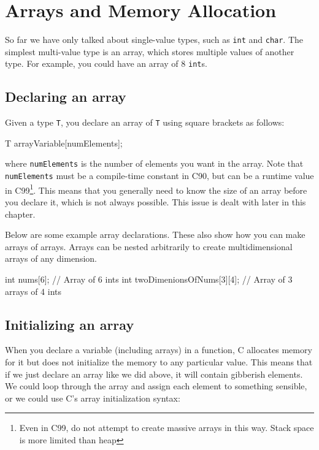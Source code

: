 
\chapter{Arrays and Memory Allocation}

So far we have only talked about single-value types, such as \texttt{int} and \texttt{char}.
The simplest multi-value type is an array, which stores multiple values of another type.
For example, you could have an array of 8 \texttt{int}s.

\section{Declaring an array}

Given a type \texttt{T}, you declare an array of \texttt{T} using square brackets as follows:
\begin{codeinline}
T arrayVariable[numElements];
\end{codeinline}
where \texttt{numElements} is the number of elements you want in the array.
Note that \texttt{numElements} must be a compile-time constant in C90, but can be a runtime value in C99\footnote{Even in C99, do not attempt to create massive arrays in this way.
Stack space is more limited than heap}.
This means that you generally need to know the size of an array before you declare it, which is not always possible.
This issue is dealt with later in this chapter.

Below are some example array declarations.
These also show how you can make arrays of arrays.
Arrays can be nested arbitrarily to create multidimensional arrays of any dimension.

\begin{codeblock}
int nums[6]; // Array of 6 ints
int twoDimenionsOfNums[3][4]; // Array of 3 arrays of 4 ints
\end{codeblock}

\section{Initializing an array}

When you declare a variable (including arrays) in a function, C allocates memory for it but does not initialize the memory to any particular value.
This means that if we just declare an array like we did above, it will contain gibberish elements.
We could loop through the array and assign each element to something sensible, or we could use C's array initialization syntax:

